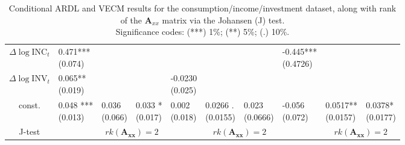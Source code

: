 \begin{landscape}
\begin{table}[ht!]
{\begin{tabular}{c lll lll lll}
    $\Delta\log\text{INC}_t$ &
    \makecell{0.471***\\ (0.074)} & & &
    & & &
    \makecell{-0.445***\\ (0.4726)} & & \\
    
    $\Delta\log\text{INV}_t$ &
    \makecell{0.065**\\ (0.019)} & & &
    \makecell{-0.0230\\ (0.025)} & &
    & & & \\
    
    const. &
    \makecell{0.048 ***\\ (0.013) } &
    \makecell{0.036\\ (0.066)} & \makecell{0.033 *\\ (0.017)} &
    \makecell{0.002  \\ (0.018)} &
    \makecell{0.0266 . \\ (0.0155) } &  \makecell{0.023 \\ (0.0666) } &
    \makecell{-0.056 \\ (0.072) } &
    \makecell{0.0517**\\ (0.0157)}&  \makecell{0.0378*\\ (0.0177)}\\
    \hline
    J-test&&\multicolumn{2}{c}{\rule{0pt}{1em}$rk(\mathbf{A_{xx}})=2$}&&\multicolumn{2}{c}{$rk(\mathbf{A_{xx}})=2$}&&\multicolumn{2}{c}{$rk(\mathbf{A_{xx}})=2$}\\
    \bottomrule
    \end{tabular}%
    }
    \caption{Conditional ARDL and VECM results for the consumption/income/investment dataset, along with rank of the $\mathbf A_{xx}$ matrix via the Johansen (J) test.\\
    Significance codes: (***) 1\%; (**) 5\%; (.) 10\%.}
  \label{tab:est}%
\end{table}%
\end{landscape}

